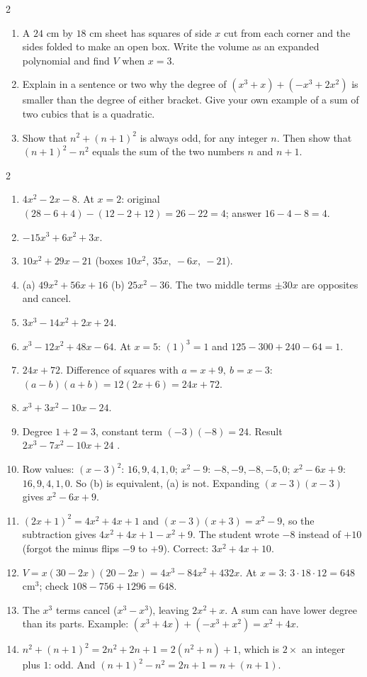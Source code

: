 \documentclass[11pt]{article}
\begin{document}
\begin{recapbox}
\begin{multicols}{2}
\begin{enumerate}[leftmargin=*,itemsep=3pt]
  \item A $24$ cm by $18$ cm sheet has squares of side $x$ cut from each corner and the sides folded to make an open box. Write the volume as an expanded polynomial and find $V$ when $x=3$.
  \item Explain in a sentence or two why the degree of $(x^3+x)+(-x^3+2x^2)$ is smaller than the degree of either bracket. Give your own example of a sum of two cubics that is a quadratic.
  \item Show that $n^2+(n+1)^2$ is always odd, for any integer $n$. Then show that $(n+1)^2-n^2$ equals the sum of the two numbers $n$ and $n+1$.
\end{enumerate}
\end{multicols}
\end{recapbox}

\begin{keybox}
\begin{multicols}{2}
\small
\begin{enumerate}[leftmargin=*,itemsep=3pt]
  \item $4x^2 - 2x - 8$. At $x=2$: original $(28-6+4)-(12-2+12)=26-22=4$; answer $16-4-8=4$.
  \item $-15x^3 + 6x^2 + 3x$.
  \item $10x^2 + 29x - 21$ (boxes $10x^2,\ 35x,\ -6x,\ -21$).
  \item (a) $49x^2 + 56x + 16$ \quad (b) $25x^2 - 36$. The two middle terms $\pm30x$ are opposites and cancel.
  \item $3x^3 - 14x^2 + 2x + 24$.
  \item $x^3 - 12x^2 + 48x - 64$. At $x=5$: $(1)^3=1$ and $125-300+240-64=1$.
  \item $24x + 72$. Difference of squares with $a=x+9,\ b=x-3$: $(a-b)(a+b)=12(2x+6)=24x+72$.
  \item $x^3 + 3x^2 - 10x - 24$.
  \item Degree $1+2=3$, constant term $(-3)(-8)=24$. Result $2x^3 - 7x^2 - 10x + 24$ \quad \checkmark.
  \item Row values: $(x-3)^2$: $16,9,4,1,0$; $x^2-9$: $-8,-9,-8,-5,0$; $x^2-6x+9$: $16,9,4,1,0$. So (b) is equivalent, (a) is not. Expanding $(x-3)(x-3)$ gives $x^2-6x+9$.
  \item $(2x+1)^2=4x^2+4x+1$ and $(x-3)(x+3)=x^2-9$, so the subtraction gives $4x^2+4x+1-x^2+9$. The student wrote $-8$ instead of $+10$ (forgot the minus flips $-9$ to $+9$). Correct: $3x^2 + 4x + 10$.
  \item $V=x(30-2x)(20-2x)=4x^3 - 84x^2 + 432x$. At $x=3$: $3\cdot18\cdot12=648$ cm$^3$; check $108-756+1296=648$.
  \item The $x^3$ terms cancel ($x^3-x^3$), leaving $2x^2+x$. A sum can have lower degree than its parts. Example: $(x^3+4x)+(-x^3+x^2)=x^2+4x$.
  \item $n^2+(n+1)^2=2n^2+2n+1=2(n^2+n)+1$, which is $2\times$ an integer plus $1$: odd. And $(n+1)^2-n^2=2n+1=n+(n+1)$.
\end{enumerate}
\end{multicols}
\end{keybox}
\end{document}
